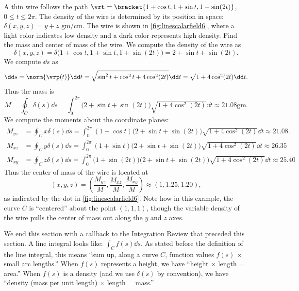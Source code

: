 \begin{example}\label{ex_linescalarfield6}
A
%
%
thin wire follows the path $\vrt =\bracket{1+\cos t,1+\sin t, 1+ \sin(2t)}$, $0\leq t\leq 2\pi$. The density of the wire is determined by its position in space: $\delta(x,y,z) = y+z$ gm/cm. The wire is shown in \autoref{fig:linescalarfield6}, where a light color indicates low density and a dark color represents high density. Find the mass  and center of mass of the wire.
\solution
We compute the density of the wire as 
\[
\delta(x,y,z) = \delta\bigl(1+\cos t,1+\sin t, 1+\sin(2t)\bigr) = 2+\sin t+\sin(2t).
\]
We compute $\dd s$ as
\[
\dd s = \norm{\vrp(t)}\dd t = \sqrt{\sin^2t+\cos^2t+4\cos^2(2t)}\dd t
= \sqrt{1+4\cos^2(2t)}\dd t.
\]
Thus the mass is
\[
M = \oint_C \delta(s)\dd s = \int_0^{2\pi} \bigl(2+\sin t+\sin(2t)\bigr)\sqrt{1+4\cos^2(2t)}\dd t
\approx 21.08\text{gm}.
\]
We compute the moments about the coordinate planes:
{\small
\begin{align*}
M_{yz} &= \oint_C x\delta(s)\dd s = \int_0^{2\pi}\!\!(1+\cos t)\bigl(2+\sin t+\sin(2t)\bigr)\sqrt{1+4\cos^2(2t)}\dd t \approx 21.08. \\
M_{xz} &= \oint_C y\delta(s)\dd s = \int_0^{2\pi}\!\!(1+\sin t)\bigl(2+\sin t+\sin(2t)\bigr)\sqrt{1+4\cos^2(2t)}\dd t \approx
26.35\\
M_{xy} &= \oint_C z\delta(s)\dd s = \int_0^{2\pi}\!\!\bigl(1+\sin(2 t)\bigr)\bigl(2+\sin t+\sin(2t)\bigr)\sqrt{1+4\cos^2(2t)}\dd t \approx 25.40
\end{align*}}
Thus the center of mass of the wire is located at 
\[
(\overline{x},\overline{y},\overline{z})
=\left(\frac{M_{yz}}M, \frac{M_{xz}}M,\frac{M_{xy}}M\right) \approx (1,1.25,1.20),
\]
as indicated by the dot in \autoref{fig:linescalarfield6}. Note how in this example, the curve $C$ is ``centered'' about the point $(1,1,1)$, though the variable density of the wire pulls the center of mass out along the $y$ and $z$ axes.
\end{example}

We end this section with a callback to the Integration Review that preceded this section. A line integral looks like: $\int_C f(s)\dd s$. As stated before the definition of the line integral, this means ``sum up, along a curve $C$, function values $f(s)$ $\times$ small arc lengths.'' When $f(s)$ represents a height, we have ``height $\times$ length = area.'' When $f(s)$ is a density (and we use $\delta(s)$ by convention), we have ``density (mass per unit length) $\times$ length = mass.''

